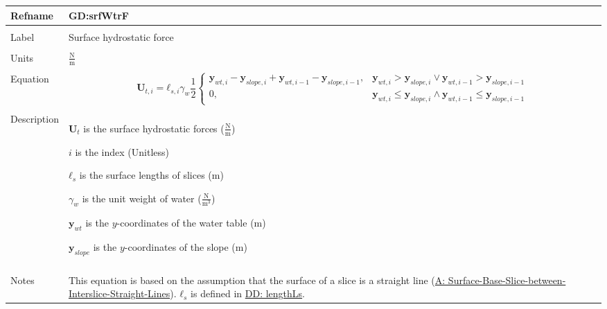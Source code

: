 \documentclass[12pt]{article}
\begin{document}
\vspace{\baselineskip}
\noindent
\begin{minipage}{\textwidth}
\begin{tabular}{>{\raggedright}p{}>{\raggedright\arraybackslash}p{}}
\toprule \textbf{Refname} & \textbf{GD:srfWtrF}
\label{GD:srfWtrF}
\\ \midrule \\
Label & Surface hydrostatic force
        
\\ \midrule \\
Units & $\frac{\text{N}}{\text{m}}$
        
\\ \midrule \\
Equation & \begin{displaymath}
           {\mathbf{U}_{t,i}}={\mathbf{ℓ}_{s,i}} {γ_{w}} \frac{1}{2} \begin{cases}
                                                                     {\mathbf{y}_{wt,i}}-{\mathbf{y}_{slope,i}}+{\mathbf{y}_{wt,i-1}}-{\mathbf{y}_{slope,i-1}}, & {\mathbf{y}_{wt,i}}>{\mathbf{y}_{slope,i}}\lor{}{\mathbf{y}_{wt,i-1}}>{\mathbf{y}_{slope,i-1}}\\
0, & {\mathbf{y}_{wt,i}}\leq{}{\mathbf{y}_{slope,i}}\land{}{\mathbf{y}_{wt,i-1}}\leq{}{\mathbf{y}_{slope,i-1}}
                                                                     \end{cases}
           \end{displaymath}
\\ \midrule \\
Description & \begin{symbDescription}
              \item{${\mathbf{U}_{t}}$ is the surface hydrostatic forces ($\frac{\text{N}}{\text{m}}$)}
              \item{$i$ is the index (Unitless)}
              \item{${\mathbf{ℓ}_{s}}$ is the surface lengths of slices (m)}
              \item{${γ_{w}}$ is the unit weight of water ($\frac{\text{N}}{\text{m}^{3}}$)}
              \item{${\mathbf{y}_{wt}}$ is the $y$-coordinates of the water table (m)}
              \item{${\mathbf{y}_{slope}}$ is the $y$-coordinates of the slope (m)}
              \end{symbDescription}
\\ \midrule \\
Notes & This equation is based on the assumption that the surface of a slice is a straight line (\hyperref[assumpSBSBISL]{A: Surface-Base-Slice-between-Interslice-Straight-Lines}). ${\mathbf{ℓ}_{s}}$ is defined in \hyperref[DD:lengthLs]{DD: lengthLs}.
        

\end{tabular}
\end{minipage}
\end{document}
